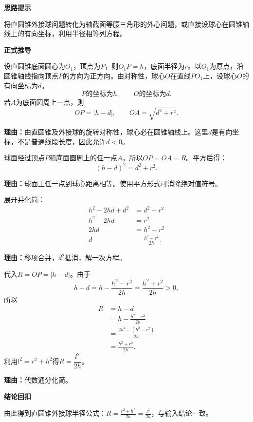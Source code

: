 \begin{proofbox}

	\textbf{\textcolor{CProof}{思路提示}}

	将直圆锥外接球问题转化为轴截面等腰三角形的外心问题，或直接设球心在圆锥轴线上的有向坐标，利用半径相等列方程。

	\medskip
	\textbf{\textcolor{CProof}{正式推导}}
	\begin{description}[style=nextline, leftmargin=2.8em, labelsep=0.5em, itemsep=0.55em]
		\item[\textbf{步骤一（设球心位置）：}] 设直圆锥底面圆心为$O_1$，顶点为$P$，则$O_1P=h$，底面半径为$r$。以$O_1$为原点，沿圆锥轴线指向顶点$P$的方向为正方向。由对称性，球心$O$在直线$PO_1$上，设球心$O$的有向坐标为$d$。
		      \[
			      P\text{的坐标为}h,\qquad O\text{的坐标为}d.
		      \]
		      若$A$为底面圆周上一点，则
		      \[
			      OP=|h-d|,\qquad OA=\sqrt{d^2+r^2}.
		      \]
		      \par\textbf{理由：}由直圆锥及外接球的旋转对称性，球心必在圆锥轴线上。这里$d$是有向坐标，不是普通线段长度，因此允许$d<0$。

		\item[\textbf{步骤二（列方程）：}] 球面经过顶点$P$和底面圆周上的任一点$A$，所以$OP=OA=R$。平方后得：
		      \[
			      (h-d)^2 = d^2 + r^2.
		      \]
		      \par\textbf{理由：}球面上任一点到球心距离相等。使用平方形式可消除绝对值符号。

		\item[\textbf{步骤三（解方程）：}] 展开并化简：
		      \[
			      \begin{aligned}
				      h^2 - 2hd + d^2 & = d^2 + r^2             \\
				      h^2 - 2hd       & = r^2                   \\
				      2hd             & = h^2 - r^2             \\
				      d               & = \frac{h^2 - r^2}{2h}.
			      \end{aligned}
		      \]
		      \par\textbf{理由：}移项合并，$d^2$抵消，解一次方程。

		\item[\textbf{步骤四（求半径）：}] 代入$R=OP=|h-d|$。由于
		      \[
			      h-d=h-\frac{h^2-r^2}{2h}=\frac{h^2+r^2}{2h}>0,
		      \]
		      所以
		      \[
			      \begin{aligned}
				      R & = h - d                         \\
				        & = h - \frac{h^2 - r^2}{2h}      \\
				        & = \frac{2h^2 - (h^2 - r^2)}{2h} \\
				        & = \frac{h^2+r^2}{2h}.
			      \end{aligned}
		      \]
		      利用$l^2 = r^2+h^2$得$R = \dfrac{l^2}{2h}$。
		      \par\textbf{理由：}代数通分化简。
	\end{description}

	\medskip
	\textbf{\textcolor{CProof}{结论回扣}}

	由此得到直圆锥外接球半径公式：$\displaystyle R = \frac{r^2+h^2}{2h} = \frac{l^2}{2h}$，与输入结论一致。

\end{proofbox}